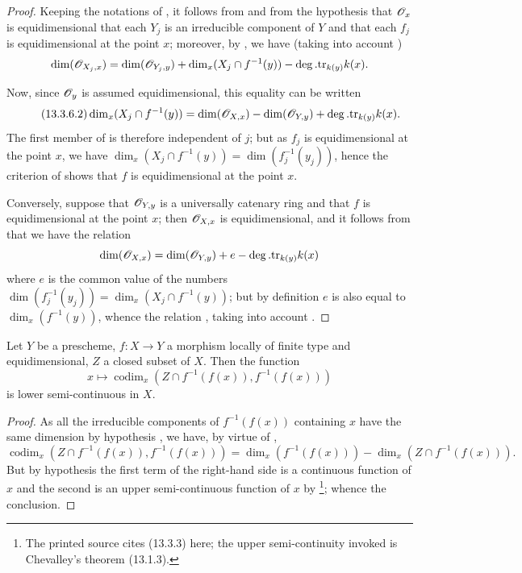 \begin{proof}
Keeping the notations of , it follows from  and from the hypothesis that $\mathscr{O}_x$ is equidimensional that each $Y_j$ is an irreducible component of $Y$ and that each $f_j$ is equidimensional at the point $x$; moreover, by , we have (taking into account )
\[
  \dim(\mathscr{O}_{X_j,x})=\dim(\mathscr{O}_{Y_j,y})+\dim_x(X_j\cap f^{-1}(y))-\deg.\mathrm{tr}_{k(y)}k(x).
\]


Now, since $\mathscr{O}_y$ is assumed equidimensional, this equality can be written
\[
\tag{13.3.6.2}
\label{IV.13.3.6.2}
  \dim_x(X_j\cap f^{-1}(y))=\dim(\mathscr{O}_{X,x})-\dim(\mathscr{O}_{Y,y})+\deg.\mathrm{tr}_{k(y)}k(x).
\]
The first member of  is therefore independent of $j$; but as $f_j$ is equidimensional at the point $x$, we have $\dim_x(X_j\cap f^{-1}(y))=\dim(f_j^{-1}(y_j))$, hence the criterion of  shows that $f$ is equidimensional at the point $x$.

Conversely, suppose that $\mathscr{O}_{Y,y}$ is a universally catenary ring and that $f$ is equidimensional at the point $x$; then  $\mathscr{O}_{X,x}$ is equidimensional, and it follows from  that we have the relation
\[
  \dim(\mathscr{O}_{X,x})=\dim(\mathscr{O}_{Y,y})+e-\deg.\mathrm{tr}_{k(y)}k(x)
\]
where $e$ is the common value of the numbers $\dim(f_j^{-1}(y_j))=\dim_x(X_j\cap f^{-1}(y))$; but by definition $e$ is also equal to $\dim_x(f^{-1}(y))$, whence the relation , taking into account .
\end{proof}

\begin{proposition}[13.3.7]
\label{IV.13.3.7}
Let $Y$ be a prescheme, $f:X\to Y$ a morphism locally of finite type and equidimensional, $Z$ a closed subset of $X$.
Then the function
\[
\label{IV.13.3.7.1}
\tag{13.3.7.1}
  x\mapsto\operatorname{codim}_x(Z\cap f^{-1}(f(x)),f^{-1}(f(x)))
\]
is lower semi-continuous in $X$.
\end{proposition}

\begin{proof}
As all the irreducible components of $f^{-1}(f(x))$ containing $x$ have the same dimension by hypothesis , we have, by virtue of ,
\[
  \operatorname{codim}_x(Z\cap f^{-1}(f(x)),f^{-1}(f(x)))=\dim_x(f^{-1}(f(x)))-\dim_x(Z\cap f^{-1}(f(x))).
\]
But by hypothesis the first term of the right-hand side is a continuous function of $x$  and the second is an upper semi-continuous function of $x$ by \footnote{The printed source cites (13.3.3) here; the upper semi-continuity invoked is Chevalley's theorem (13.1.3).}; whence the conclusion.
\end{proof}

